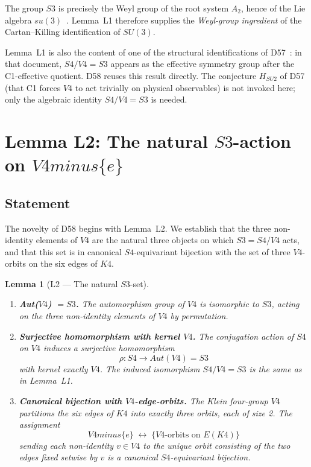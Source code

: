 \documentclass[11pt,a4paper]{article}
\def\Sfour{S4}%
\def\Vfour{V4}%
\def\Sthree{S3}%
\def\SUthree{SU(3)}%
\def\Kfour{K4}%
\def\cong{=}%
\def\setminus{ minus }%
\def\Aut{Aut}%
\def\suthree{su(3)}%
\def\mathrm#1{#1}%
\def\mathfrak#1{#1}%
\theoremstyle{plain}
\newtheorem{lemma}[theorem]{Lemma}
\theoremstyle{definition}
\theoremstyle{remark}
\newcommand{\Kfour}{K_4}
\newcommand{\Sfour}{S_4}
\newcommand{\Vfour}{V_4}
\newcommand{\Sthree}{S_3}
\newcommand{\SUthree}{\mathrm{SU}(3)}
\newcommand{\Aut}{\mathrm{Aut}}
\newcommand{\suthree}{\mathfrak{su}(3)}
\begin{document}
The group $\Sthree$ is precisely the Weyl group of the root system $A_2$, hence of the Lie algebra $\suthree$~\cite{Bourbaki_Lie,Humphreys_Lie}. Lemma~L1 therefore supplies the \emph{Weyl-group ingredient} of the Cartan--Killing identification of $\SUthree$.

Lemma~L1 is also the content of one of the structural identifications of D57~\cite{PDL_D57}: in that document, $\Sfour/\Vfour \cong \Sthree$ appears as the effective symmetry group after the C1-effective quotient. D58 reuses this result directly. The conjecture $H_{\mathrm{SU2}}$ of D57 (that C1 forces $\Vfour$ to act trivially on physical observables) is not invoked here; only the algebraic identity $\Sfour/\Vfour \cong \Sthree$ is needed.

\section{Lemma L2: The natural \texorpdfstring{$\Sthree$}{S3}-action on \texorpdfstring{$\Vfour \setminus \{e\}$}{V4 minus e}}
\label{sec:L2}

\subsection{Statement}

The novelty of D58 begins with Lemma~L2. We establish that the three non-identity elements of $\Vfour$ are the natural three objects on which $\Sthree = \Sfour/\Vfour$ acts, and that this set is in canonical $\Sfour$-equivariant bijection with the set of three $\Vfour$-orbits on the six edges of $\Kfour$.

\begin{lemma}[L2 --- The natural $\Sthree$-set]
\label{lem:L2}
\hfill
\begin{enumerate}[label=(\alph*),leftmargin=2em]
\item \textbf{Aut($\Vfour$) $= \Sthree$.} The automorphism group of $\Vfour$ is isomorphic to $\Sthree$, acting on the three non-identity elements of $\Vfour$ by permutation.
\item \textbf{Surjective homomorphism with kernel $\Vfour$.} The conjugation action of $\Sfour$ on $\Vfour$ induces a surjective homomorphism
\[
\rho \colon \Sfour \longrightarrow \Aut(\Vfour) \cong \Sthree
\]
with kernel exactly $\Vfour$. The induced isomorphism $\Sfour/\Vfour \cong \Sthree$ is the same as in Lemma~L1.
\item \textbf{Canonical bijection with $\Vfour$-edge-orbits.} The Klein four-group $\Vfour$ partitions the six edges of $\Kfour$ into exactly three orbits, each of size 2. The assignment
\[
\Vfour \setminus \{e\} \;\longleftrightarrow\; \{\Vfour\text{-orbits on } E(\Kfour)\}
\]
sending each non-identity $v \in \Vfour$ to the unique orbit consisting of the two edges fixed setwise by $v$ is a canonical $\Sfour$-equivariant bijection.
\end{enumerate}
\end{lemma}
\end{document}
